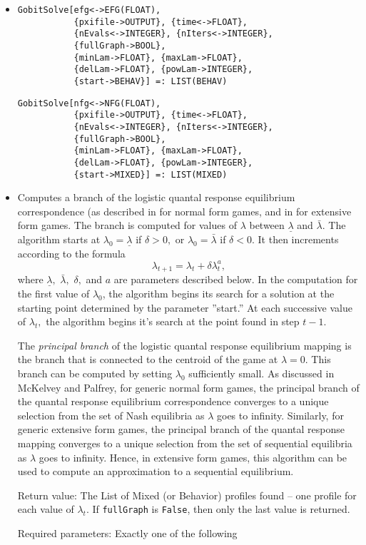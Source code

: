 \begin{itemize}

\item
\protect \large \begin{verbatim}
GobitSolve[efg<->EFG(FLOAT),
           {pxifile->OUTPUT}, {time<->FLOAT},
           {nEvals<->INTEGER}, {nIters<->INTEGER},
           {fullGraph->BOOL},
           {minLam->FLOAT}, {maxLam->FLOAT}, 
           {delLam->FLOAT}, {powLam->INTEGER}, 
           {start->BEHAV}] =: LIST(BEHAV)
\end{verbatim}\normalsize

\protect \large \begin{verbatim}
GobitSolve[nfg<->NFG(FLOAT),
           {pxifile->OUTPUT}, {time<->FLOAT},
           {nEvals<->INTEGER}, {nIters<->INTEGER},
           {fullGraph->BOOL},
           {minLam->FLOAT}, {maxLam->FLOAT}, 
           {delLam->FLOAT}, {powLam->INTEGER}, 
           {start->MIXED}] =: LIST(MIXED)
\end{verbatim}\normalsize

\bd
\item
Computes a branch of the logistic quantal response
equilibrium correspondence (as described in \cite[1995]{McKPal:95a}
for normal form games, and in \cite[1995b]{McKPal:95b} for extensive
form games.  The branch is computed for values of $\lambda$ between
$\underline{\lambda}$ and $\bar{\lambda}.$ The algorithm starts at
$\lambda_0 = \underline{\lambda}$ if $\delta>0,$ or $\lambda_0 =
\bar{\lambda}$ if $\delta<0$. It then increments according to the
formula 
$$
\lambda_{t+1} = \lambda_t +\delta \lambda_t^a,
$$ where $\underline\lambda,$ $\bar\lambda,$ $\delta,$ and $a$ are
parameters described below. In the computation for the first value of
$\lambda_0$, the algorithm begins its search for a solution at the
starting point determined by the parameter ''start.''  At each
successive value of $\lambda_t,$ the algorithm begins it's search at
the point found in step $t - 1.$ 

The {\em principal branch} of the logistic quantal response
equilibrium mapping is the branch that is connected to the centroid of
the game at $\lambda = 0$.  This branch can be computed by setting
$\lambda_0$ sufficiently small.  As discussed in McKelvey and Palfrey,
for generic normal form games, the principal branch of the quantal
response equilibrium correspondence converges to a unique selection
from the set of Nash equilibria as $\lambda$ goes to infinity.
Similarly, for generic extensive form games, the principal branch of
the quantal response mapping converges to a unique selection from the
set of sequential equilibria as $\lambda$ goes to infinity.  Hence, in
extensive form games, this algorithm can be used to compute an
approximation to a sequential equilibrium.
\item
[Return value:] The List of Mixed (or Behavior) profiles found -- one
profile for each value of $\lambda_t$.  If \verb+fullGraph+ is
\verb+False+, then only the last value is returned.  
\item 
[Required parameters:]\hfil\null Exactly one of the following


\end{itemize}
